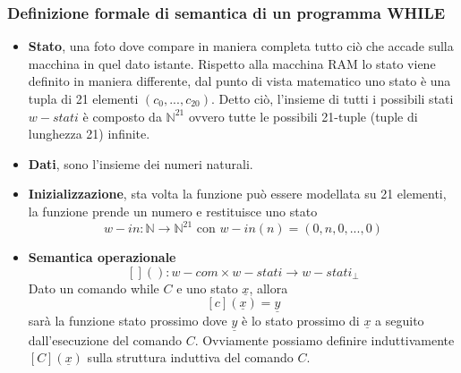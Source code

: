 \documentclass{article}
\begin{document}
\subsubsection{Definizione formale di semantica di un programma WHILE}
\begin{itemize}
    \item \textbf{Stato}, una foto dove compare in maniera completa tutto ciò che accade sulla macchina in quel dato istante.
          Rispetto alla macchina RAM lo stato viene definito in maniera differente, dal punto di vista matematico uno stato è
          una tupla di 21 elementi $(c_0, ..., c_{20})$. Detto ciò, l'insieme di tutti i possibili stati $w-stati$ è composto
          da $\mathbb{N}^{21}$ ovvero tutte le possibili 21-tuple (tuple di lunghezza 21) infinite.

    \item \textbf{Dati}, sono l'insieme dei numeri naturali.
    \item \textbf{Inizializzazione}, sta volta la funzione può essere modellata su 21 elementi, la funzione prende un
          numero e restituisce uno stato
          $$w-in:\mathbb{N}\rightarrow\mathbb{N}^{21}\text{ con }w-in(n)=(0,n,0,...,0)$$
    \item \textbf{Semantica operazionale}
          $$[]():w-com\times w-stati\rightarrow w-stati_\bot$$
          Dato un comando while $C$ e uno stato $\underline{x}$, allora
          $$[c](\underline{x})=\underline{y}$$
          sarà la funzione stato prossimo dove $\underline{y}$ è lo stato prossimo di $\underline{x}$ a seguito
          dall'esecuzione del comando $C$.
          Ovviamente possiamo definire induttivamente $[C](\underline{x})$ sulla struttura induttiva
          del comando $C$.
\end{itemize}
\end{document}
